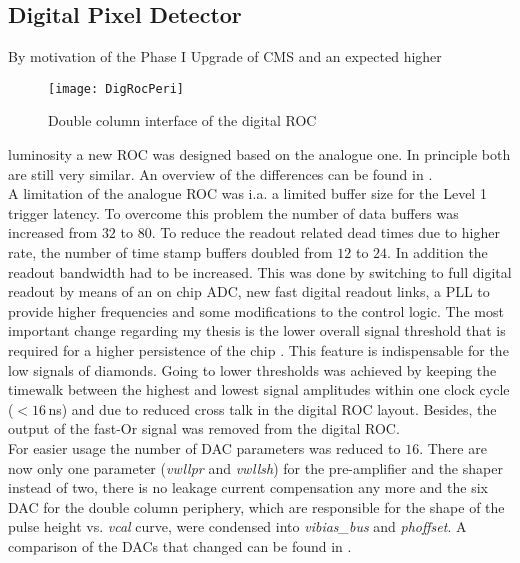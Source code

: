 \subsection{Digital Pixel Detector}\label{s23}
By motivation of the Phase I Upgrade of \ac{CMS} and an expected higher
\begin{wrapfigure}{r}{4.5cm}
	\vspace*{-10pt}
	\texttt{[image: DigRocPeri]}
	\caption{Double column interface of the digital \ac{ROC} \cite{hits}}
	\label{p12}
	\vspace*{-10pt}
\end{wrapfigure} 
luminosity a new \ac{ROC} was designed based on the analogue one. In principle both are still very similar. An overview of the differences can be found in .\\
A limitation of the analogue \ac{ROC} was i.a. a limited buffer size for the Level 1 trigger latency. To overcome this problem the number of data buffers was increased from $32$ to $80$. To reduce the readout related dead times due to higher rate, the number of time stamp buffers doubled from $12$ to $24$. In addition the readout bandwidth had to be increased. This was done by switching to full digital readout by means of an on chip \ac{ADC}, new fast digital readout links, a \ac{PLL} to provide higher frequencies and some modifications to the control logic. The most important change regarding my thesis is the lower overall signal threshold that is required for a higher persistence of the chip \cite{hits}. This feature is indispensable for the low signals of diamonds. Going to lower thresholds was achieved by keeping the timewalk between the highest and lowest signal amplitudes within one clock cycle ($<16\,$ns) and due to reduced cross talk in the digital \ac{ROC} layout. Besides, the output of the fast-Or signal was removed from the digital \ac{ROC}.\\
For easier usage the number of \ac{DAC} parameters was reduced to $16$. There are now only one parameter (\textit{vwllpr} and \textit{vwllsh}) for the pre-amplifier and the shaper instead of two, there is no leakage current compensation any more and the six \ac{DAC} for the double column periphery, which are responsible for the shape of the pulse height vs. \textit{vcal} curve, were condensed into \textit{vibias\_bus} and \textit{phoffset}. A comparison of the \ac{DAC}s that changed can be found in .
